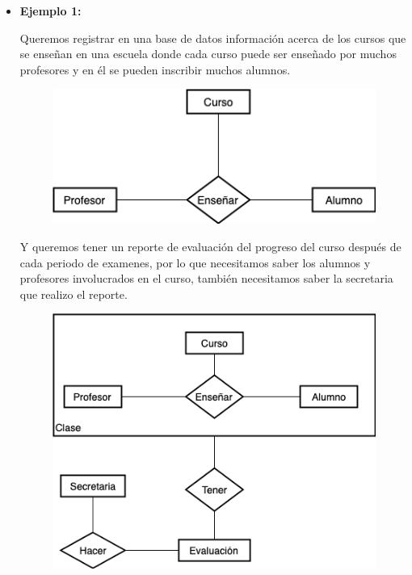 \documentclass[letterpaper,11pt]{article}
\begin{document}
\begin{itemize}
    \begin{itemize}
        \item  \textbf{Ejemplo 1:}

               Queremos registrar en una base de datos información acerca
               de los cursos que se enseñan en una escuela donde cada
               curso puede ser enseñado por muchos profesores y en él
               se pueden inscribir muchos alumnos.

               \begin{figure}[h]
                \centering
                \includegraphics[scale=0.6]{./imagenes/Ejemplo1.jpg}
                \end{figure}

               Y queremos tener un reporte de evaluación del
               progreso del curso después de cada periodo de examenes,
               por lo que necesitamos saber los alumnos y profesores
               involucrados en el curso, también necesitamos saber
               la secretaria que realizo el reporte.

               \begin{figure}[H]
                \centering
                \includegraphics[scale=0.6]{./imagenes/Ejemplo1a.jpg}
                \end{figure}


\end{itemize}
\end{itemize}
\end{document}
